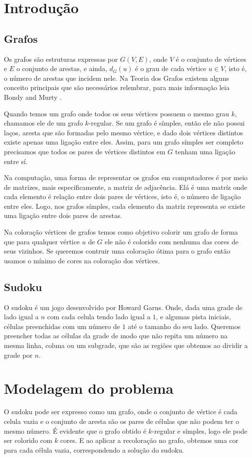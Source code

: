 \documentclass[12pt,a4paper]{article}
\begin{document}
	\section{Introdução}
	\subsection{Grafos}
	Os grafos são estruturas expressas por $G(V, E)$, onde $V$ é o conjunto de vértices e $E$ o conjunto de arestas, e ainda, $d_{G}(u)$ é o grau de cada vértice $u \in V$, isto é, o número de arestas que incidem nele. Na Teoria dos Grafos existem alguns conceito principais que são necessários relembrar, para mais informação leia Bondy and Murty \cite{bondymurty76}. 
	
	Quando temos um grafo onde todos os seus vértices possuem o mesmo grau $k$, chamamos ele de um grafo $k$-regular. Se um grafo é símples, então ele não possui laços, aresta que são formadas pelo mesmo vértice, e dado dois vértices distintos existe apenas uma ligação entre eles. Assim, para um grafo símples ser completo precisamos que todos os pares de vértices distintos em $G$ tenham uma ligação entre sí.
	
	Na computação, uma forma de representar os grafos em computadores é por meio de matrizes, mais especificamente, a matriz de adjacência. Elá é uma matríz onde cada elemento é relação entre dois pares de vértices, isto é, o número de ligação entre eles. Logo, nos grafos símples, cada elemento da matriz representa se existe uma ligação entre dois pares de arestas.
	
	Na coloração vértices de grafos temos como objetivo colorir um grafo de forma que para qualquer vértice $u$ de $G$ ele não é colorido com  nenhuma das cores de seus vizinhos. Se queremos contruir uma coloração ótima para o grafo então usamos o mínimo de cores na coloração dos vértices.
	
	\subsection{Sudoku}
	O sudoku é um jogo desenvolvido por Howard Garns. Onde, dada uma grade de lado igual a $n$ com cada celula tendo lado igual a $1$, e algumas pista iniciais, células preenchidas com um número de $1$ até o tamanho do seu lado. Queremos preencher todas as células da grade de modo que não repita um número na mesma linha, coluna ou um subgrade, que são as regiões que obtemos ao dividir a grade por $n$.
	\pagebreak	
	\section{Modelagem do problema}
	O sudoku pode ser expresso como um grafo, onde o conjunto de vértice é cada celula vazia e o conjunto de aresta são os pares de células que não podem ter o mesmo número. É evidente que o grafo obtido é $k$-regular e símples, logo ele pode ser colorido com $k$ cores. E ao aplicar a recoloração no grafo, obtemos uma cor para cada célula vazia, correspondendo a solução do sudoku.
	
\end{document}
